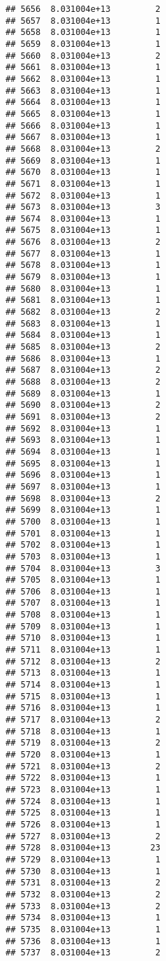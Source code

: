 \documentclass[
]{article}
\begin{document}
\begin{verbatim}
## 5656  8.031004e+13         2
## 5657  8.031004e+13         1
## 5658  8.031004e+13         1
## 5659  8.031004e+13         1
## 5660  8.031004e+13         2
## 5661  8.031004e+13         1
## 5662  8.031004e+13         1
## 5663  8.031004e+13         1
## 5664  8.031004e+13         1
## 5665  8.031004e+13         1
## 5666  8.031004e+13         1
## 5667  8.031004e+13         1
## 5668  8.031004e+13         2
## 5669  8.031004e+13         1
## 5670  8.031004e+13         1
## 5671  8.031004e+13         1
## 5672  8.031004e+13         1
## 5673  8.031004e+13         3
## 5674  8.031004e+13         1
## 5675  8.031004e+13         1
## 5676  8.031004e+13         2
## 5677  8.031004e+13         1
## 5678  8.031004e+13         1
## 5679  8.031004e+13         1
## 5680  8.031004e+13         1
## 5681  8.031004e+13         1
## 5682  8.031004e+13         2
## 5683  8.031004e+13         1
## 5684  8.031004e+13         1
## 5685  8.031004e+13         2
## 5686  8.031004e+13         1
## 5687  8.031004e+13         2
## 5688  8.031004e+13         2
## 5689  8.031004e+13         1
## 5690  8.031004e+13         2
## 5691  8.031004e+13         2
## 5692  8.031004e+13         1
## 5693  8.031004e+13         1
## 5694  8.031004e+13         1
## 5695  8.031004e+13         1
## 5696  8.031004e+13         1
## 5697  8.031004e+13         1
## 5698  8.031004e+13         2
## 5699  8.031004e+13         1
## 5700  8.031004e+13         1
## 5701  8.031004e+13         1
## 5702  8.031004e+13         1
## 5703  8.031004e+13         1
## 5704  8.031004e+13         3
## 5705  8.031004e+13         1
## 5706  8.031004e+13         1
## 5707  8.031004e+13         1
## 5708  8.031004e+13         1
## 5709  8.031004e+13         1
## 5710  8.031004e+13         1
## 5711  8.031004e+13         1
## 5712  8.031004e+13         2
## 5713  8.031004e+13         1
## 5714  8.031004e+13         1
## 5715  8.031004e+13         1
## 5716  8.031004e+13         1
## 5717  8.031004e+13         2
## 5718  8.031004e+13         1
## 5719  8.031004e+13         2
## 5720  8.031004e+13         1
## 5721  8.031004e+13         2
## 5722  8.031004e+13         1
## 5723  8.031004e+13         1
## 5724  8.031004e+13         1
## 5725  8.031004e+13         1
## 5726  8.031004e+13         1
## 5727  8.031004e+13         2
## 5728  8.031004e+13        23
## 5729  8.031004e+13         1
## 5730  8.031004e+13         1
## 5731  8.031004e+13         2
## 5732  8.031004e+13         2
## 5733  8.031004e+13         2
## 5734  8.031004e+13         1
## 5735  8.031004e+13         1
## 5736  8.031004e+13         1
## 5737  8.031004e+13         2

\end{verbatim}
\end{document}
